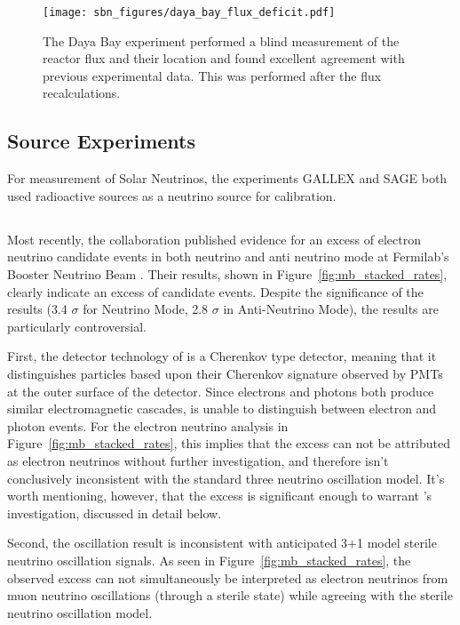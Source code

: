 \begin{figure}[tb]
  \centering
  \texttt{[image: sbn\_figures/daya\_bay\_flux\_deficit.pdf]}
  \caption{The Daya Bay experiment performed a blind measurement of the reactor flux and their location and found excellent agreement with previous experimental data.  This was performed after the flux recalculations.}
  \label{fig:daya_bay_reactor_flux}
\end{figure}

\subsection{Source Experiments}

For measurement of Solar Neutrinos, the experiments GALLEX and SAGE both used radioactive sources as a neutrino source for calibration.

\cite{Abdurashitov:1998ne} \cite{Hampel:1997fc}

\subsection{\MB}

Most recently, the \MB collaboration published evidence for an excess of electron neutrino candidate events in both neutrino and anti neutrino mode at Fermilab's Booster Neutrino Beam \cite{Aguilar-Arevalo:2013pmq}.  Their results, shown in Figure~\ref{fig:mb_stacked_rates}, clearly indicate an excess of candidate events.  Despite the significance of the results (3.4 $\sigma$ for Neutrino Mode, 2.8 $\sigma$ in Anti-Neutrino Mode), the \MB results are particularly controversial.

First, the detector technology of \MB is a Cherenkov type detector, meaning that it distinguishes particles based upon their Cherenkov signature observed by PMTs at the outer surface of the detector.  Since electrons and photons both produce similar electromagnetic cascades, \MB is unable to distinguish between electron and photon events.  For the electron neutrino analysis in Figure~\ref{fig:mb_stacked_rates}, this implies that the excess can not be attributed as electron neutrinos without further investigation, and therefore isn't conclusively inconsistent with the standard three neutrino oscillation model.  It's worth mentioning, however, that the excess is significant enough to warrant \uboone's investigation, discussed in detail below.

Second, the \MB oscillation result is inconsistent with anticipated 3+1 model sterile neutrino oscillation signals.  As seen in Figure~\ref{fig:mb_stacked_rates}, the observed excess can not simultaneously be interpreted as electron neutrinos from muon neutrino oscillations (through a sterile state) while agreeing with the sterile neutrino oscillation model.

